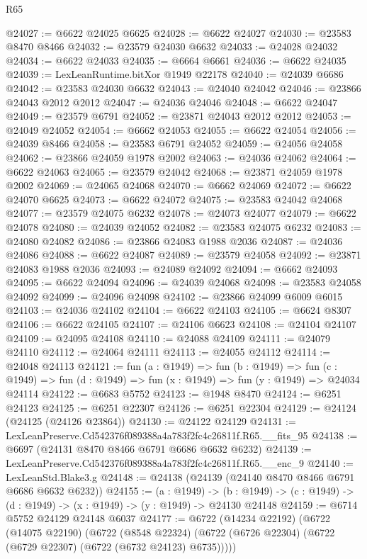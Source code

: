 \begin{lexlean}{R65}
\begin{coremodule}
{@24027 := @6622 @24025 @6625
@24028 := @6622 @24027
@24030 := @23583 @8470 @8466
@24032 := @23579 @24030 @6632
@24033 := @24028 @24032
@24034 := @6622 @24033
@24035 := @6664 @6661
@24036 := @6622 @24035
@24039 := LexLeanRuntime.bitXor @1949 @22178
@24040 := @24039 @6686
@24042 := @23583 @24030 @6632
@24043 := @24040 @24042
@24046 := @23866 @24043 @2012 @2012
@24047 := @24036 @24046
@24048 := @6622 @24047
@24049 := @23579 @6791
@24052 := @23871 @24043 @2012 @2012
@24053 := @24049 @24052
@24054 := @6662 @24053
@24055 := @6622 @24054
@24056 := @24039 @8466
@24058 := @23583 @6791 @24052
@24059 := @24056 @24058
@24062 := @23866 @24059 @1978 @2002
@24063 := @24036 @24062
@24064 := @6622 @24063
@24065 := @23579 @24042
@24068 := @23871 @24059 @1978 @2002
@24069 := @24065 @24068
@24070 := @6662 @24069
@24072 := @6622 @24070 @6625
@24073 := @6622 @24072
@24075 := @23583 @24042 @24068
@24077 := @23579 @24075 @6232
@24078 := @24073 @24077
@24079 := @6622 @24078
@24080 := @24039 @24052
@24082 := @23583 @24075 @6232
@24083 := @24080 @24082
@24086 := @23866 @24083 @1988 @2036
@24087 := @24036 @24086
@24088 := @6622 @24087
@24089 := @23579 @24058
@24092 := @23871 @24083 @1988 @2036
@24093 := @24089 @24092
@24094 := @6662 @24093
@24095 := @6622 @24094
@24096 := @24039 @24068
@24098 := @23583 @24058 @24092
@24099 := @24096 @24098
@24102 := @23866 @24099 @6009 @6015
@24103 := @24036 @24102
@24104 := @6622 @24103
@24105 := @6624 @8307
@24106 := @6622 @24105
@24107 := @24106 @6623
@24108 := @24104 @24107
@24109 := @24095 @24108
@24110 := @24088 @24109
@24111 := @24079 @24110
@24112 := @24064 @24111
@24113 := @24055 @24112
@24114 := @24048 @24113
@24121 := fun (a : @1949) =>
  fun (b : @1949) =>
  fun (c : @1949) => fun (d : @1949) => fun (x : @1949) => fun (y : @1949) => @24034 @24114
@24122 := @6683 @5752
@24123 := @1948 @8470
@24124 := @6251 @24123
@24125 := @6251 @22307
@24126 := @6251 @22304
@24129 := @24124 (@24125 (@24126 @23864))
@24130 := @24122 @24129
@24131 := LexLeanPreserve.Cd542376f089388a4a783f2fc4c26811f.R65.__fits_95
@24138 := @6697 (@24131 @8470 @8466 @6791 @6686 @6632 @6232)
@24139 := LexLeanPreserve.Cd542376f089388a4a783f2fc4c26811f.R65.__enc_9
@24140 := LexLeanStd.Blake3.g
@24148 := @24138 (@24139 (@24140 @8470 @8466 @6791 @6686 @6632 @6232))
@24155 := (a : @1949) ->
  (b : @1949) -> (c : @1949) -> (d : @1949) -> (x : @1949) -> (y : @1949) -> @24130 @24148
@24159 := @6714 @5752 @24129 @24148 @6037
@24177 := @6722
    (@14234 @22192)
    (@6722
      (@14075 @22190)
      (@6722
        (@8548 @22324)
        (@6722 (@6726 @22304) (@6722 (@6729 @22307) (@6722 (@6732 @24123) @6735)))))
}
\end{coremodule}
\end{lexlean}
